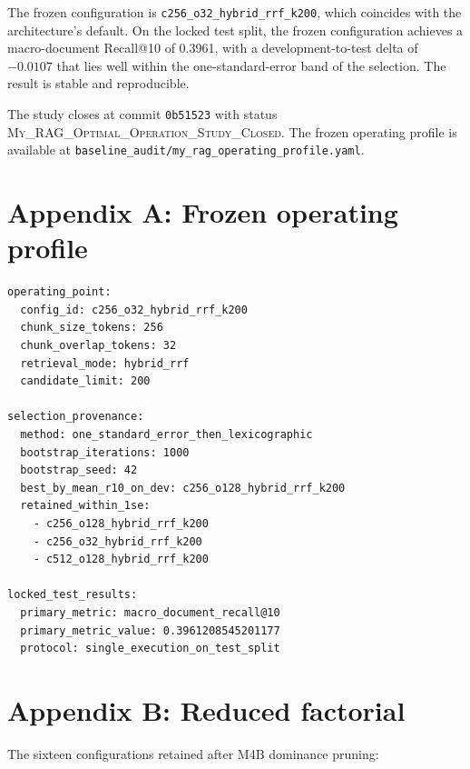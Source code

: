 \documentclass[11pt,a4paper]{article}
\begin{document}
The frozen configuration is
\texttt{c256\_o32\_hybrid\_rrf\_k200}, which coincides with the
architecture's default. On the locked test split, the frozen
configuration achieves a macro-document Recall@10 of \num{0.3961},
with a development-to-test delta of $\num{-0.0107}$ that lies well
within the one-standard-error band of the selection. The result is
stable and reproducible.

The study closes at commit \texttt{0b51523} with status
\textsc{My\_RAG\_Optimal\_Operation\_Study\_Closed}. The frozen
operating profile is available at
\texttt{baseline\_audit/my\_rag\_operating\_profile.yaml}.

\appendix

\section{Appendix A: Frozen operating profile}
\begin{lstlisting}
operating_point:
  config_id: c256_o32_hybrid_rrf_k200
  chunk_size_tokens: 256
  chunk_overlap_tokens: 32
  retrieval_mode: hybrid_rrf
  candidate_limit: 200

selection_provenance:
  method: one_standard_error_then_lexicographic
  bootstrap_iterations: 1000
  bootstrap_seed: 42
  best_by_mean_r10_on_dev: c256_o128_hybrid_rrf_k200
  retained_within_1se:
    - c256_o128_hybrid_rrf_k200
    - c256_o32_hybrid_rrf_k200
    - c512_o128_hybrid_rrf_k200

locked_test_results:
  primary_metric: macro_document_recall@10
  primary_metric_value: 0.3961208545201177
  protocol: single_execution_on_test_split
\end{lstlisting}

\section{Appendix B: Reduced factorial}
The sixteen configurations retained after M4B dominance pruning:
\end{document}
